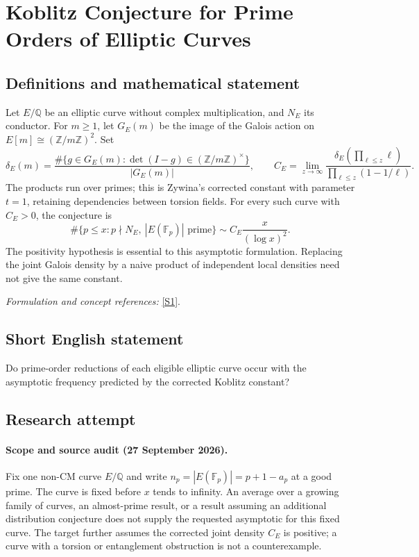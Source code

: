 \documentclass[11pt]{article}
\begin{document}
\section*{\texorpdfstring{Koblitz Conjecture for Prime Orders of Elliptic Curves}{Koblitz Conjecture for Prime Orders of Elliptic Curves}}\label{30006965}
\subsection{Definitions and mathematical statement}
Let $E/{\mathbb{Q}}$ be an elliptic curve without complex multiplication, and $N_E$ its conductor. For $m\ge1$, let $G_E(m)$ be the image of the Galois action on $E[m]\cong({\mathbb{Z}}/m{\mathbb{Z}})^2$. Set
\[
 \delta_E(m)=\frac{\#\{g\in G_E(m):\det(I-g)\in({\mathbb{Z}}/m{\mathbb{Z}})^\times\}}
 {|G_E(m)|},
 \qquad
 C_E=\lim_{z\to\infty}
 \frac{\delta_E(\prod_{\ell\le z}\ell)}{\prod_{\ell\le z}(1-1/\ell)}.
\]
The products run over primes; this is Zywina's corrected constant with parameter $t=1$, retaining dependencies between torsion fields. For every such curve with $C_E>0$, the conjecture is
\[
 \#\{p\le x:p\nmid N_E,\ |E({\mathbb{F}}_p)|\text{ prime}\}
       \sim C_E\frac{x}{(\log x)^2}.
\]
The positivity hypothesis is essential to this asymptotic formulation. Replacing the joint Galois density by a naive product of independent local densities need not give the same constant.
\par\smallskip\textit{Formulation and concept references:} \href{https://arxiv.org/abs/0909.5280}{[S1]}.

\subsection{Short English statement}
Do prime-order reductions of each eligible elliptic curve occur with the asymptotic frequency predicted by the corrected Koblitz constant?
\subsection{Research attempt}

\paragraph{Scope and source audit (27 September 2026).}
Fix one non-CM curve $E/\mathbb Q$ and write
$n_p=|E(\mathbb F_p)|=p+1-a_p$ at a good prime. The curve is fixed before
$x$ tends to infinity. An average over a growing family of curves, an
almost-prime result, or a result assuming an additional distribution
conjecture does not supply the requested asymptotic for this fixed curve.
The target further assumes the corrected joint density $C_E$ is positive;
a curve with a torsion or entanglement obstruction is not a counterexample.
\end{document}
